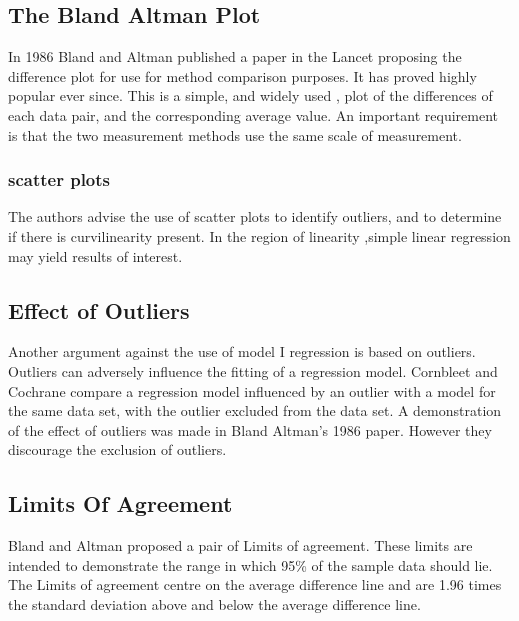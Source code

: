\documentclass[Chap1main.tex]{subfiles}
\begin{document}
\subsection{The Bland Altman Plot}
In 1986 Bland and Altman published a paper in the Lancet proposing
the difference plot for use for method comparison purposes. It has
proved highly popular ever since. This is a simple, and widely
used , plot of the differences of each data pair, and the
corresponding average value. An important requirement is that the
two measurement methods use the same scale of measurement.

\subsubsection{scatter plots} The authors advise the
use of scatter plots to identify outliers, and to determine if
there is curvilinearity present. In the region of linearity
,simple linear regression may yield results of interest.

\subsection{Effect of Outliers} Another argument against
the use of model I regression is based on outliers. Outliers can
adversely influence the fitting of a regression model. Cornbleet
and Cochrane compare a regression model influenced by an outlier
with a model for the same data set, with the outlier excluded from
the data set. A demonstration of the effect of outliers was made
in Bland Altman's 1986 paper. However they discourage the
exclusion of outliers.

\subsection{Limits Of Agreement}
Bland and Altman proposed a pair of Limits of agreement. These
limits are intended to demonstrate the range in which 95\% of the
sample data should lie. The Limits of agreement centre on the
average difference line and are 1.96 times the standard deviation
above and below the average difference line.
\end{document}
